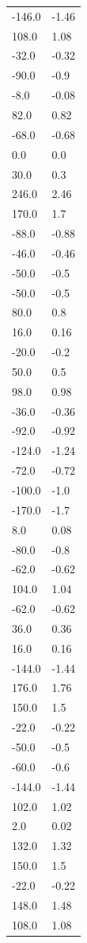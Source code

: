 \begin{longtable}{ll}
-146.0 & -1.46 \\
108.0 & 1.08 \\
-32.0 & -0.32 \\
-90.0 & -0.9 \\
-8.0 & -0.08 \\
82.0 & 0.82 \\
-68.0 & -0.68 \\
0.0 & 0.0 \\
30.0 & 0.3 \\
246.0 & 2.46 \\
170.0 & 1.7 \\
-88.0 & -0.88 \\
-46.0 & -0.46 \\
-50.0 & -0.5 \\
-50.0 & -0.5 \\
80.0 & 0.8 \\
16.0 & 0.16 \\
-20.0 & -0.2 \\
50.0 & 0.5 \\
98.0 & 0.98 \\
-36.0 & -0.36 \\
-92.0 & -0.92 \\
-124.0 & -1.24 \\
-72.0 & -0.72 \\
-100.0 & -1.0 \\
-170.0 & -1.7 \\
8.0 & 0.08 \\
-80.0 & -0.8 \\
-62.0 & -0.62 \\
104.0 & 1.04 \\
-62.0 & -0.62 \\
36.0 & 0.36 \\
16.0 & 0.16 \\
-144.0 & -1.44 \\
176.0 & 1.76 \\
150.0 & 1.5 \\
-22.0 & -0.22 \\
-50.0 & -0.5 \\
-60.0 & -0.6 \\
-144.0 & -1.44 \\
102.0 & 1.02 \\
2.0 & 0.02 \\
132.0 & 1.32 \\
150.0 & 1.5 \\
-22.0 & -0.22 \\
148.0 & 1.48 \\
108.0 & 1.08 \\

\end{longtable}
